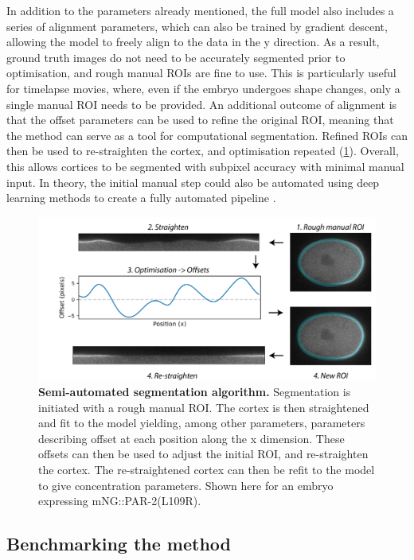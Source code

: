 \documentclass[12pt]{"report"}
\newcommand{\mycaption}[2]{\caption[#1]{\textbf{#1.} #2}}
\begin{document}
In addition to the parameters already mentioned, the full model also includes a series of alignment parameters, which can also be trained by gradient descent, allowing the model to freely align to the data in the y direction. As a result, ground truth images do not need to be accurately segmented prior to optimisation, and rough manual ROIs are fine to use. This is particularly useful for timelapse movies, where, even if the embryo undergoes shape changes, only a single manual ROI needs to be provided. An additional outcome of alignment is that the offset parameters can be used to refine the original ROI, meaning that the method can serve as a tool for computational segmentation. Refined ROIs can then be used to re-straighten the cortex, and optimisation repeated (\cref{fig:memquant_segmentation}). Overall, this allows cortices to be segmented with subpixel accuracy with minimal manual input. In theory, the initial manual step could also be automated using deep learning methods to create a fully automated pipeline \citep{Minaee2021}.\\

\begin{figure}
\includegraphics[scale=1]{memquant_segmentation}
\centering
\mycaption{Semi-automated segmentation algorithm}{
Segmentation is initiated with a rough manual ROI. The cortex is then straightened and fit to the model yielding, among other parameters, parameters describing offset at each position along the x dimension. These offsets can then be used to adjust the initial ROI, and re-straighten the cortex. The re-straightened cortex can then be refit to the model to give concentration parameters. Shown here for an embryo expressing mNG::PAR-2(L109R).
}
\label{fig:memquant_segmentation}
\end{figure}


\subsection{Benchmarking the method}
\end{document}
